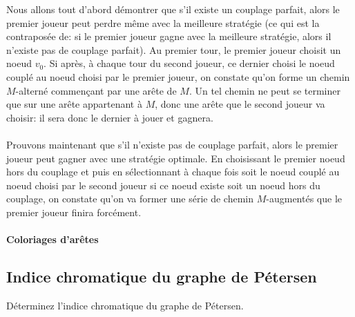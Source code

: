 \begin{solution}
Nous allons tout d'abord démontrer que s'il existe un couplage parfait, alors le premier joueur peut perdre même avec la meilleure stratégie (ce qui est la contraposée de: si le premier joueur gagne avec la meilleure stratégie, alors il n'existe pas de couplage parfait). Au premier tour, le premier joueur choisit un noeud $v_0$. Si après, à chaque tour du second joueur, ce dernier choisi le noeud couplé au noeud choisi par le premier joueur, on constate qu'on forme un chemin $M$-alterné commençant par une arête de $M$. Un tel chemin ne peut se terminer que sur une arête appartenant à $M$, donc une arête que le second joueur va choisir: il sera donc le dernier à jouer et gagnera.\\
\\
Prouvons maintenant que s'il n'existe pas de couplage parfait, alors le premier joueur peut gagner avec une stratégie optimale. En choisissant le premier noeud hors du couplage et puis en sélectionnant à chaque fois soit le noeud couplé au noeud choisi par le second joueur si ce noeud existe soit un noeud hors du couplage, on constate qu'on va former une série de chemin $M$-augmentés que le premier joueur finira forcément.
\end{solution}

\paragraph{Coloriages d'arêtes}

\subsection{Indice chromatique du graphe de Pétersen}
Déterminez l'indice chromatique du graphe de Pétersen.

